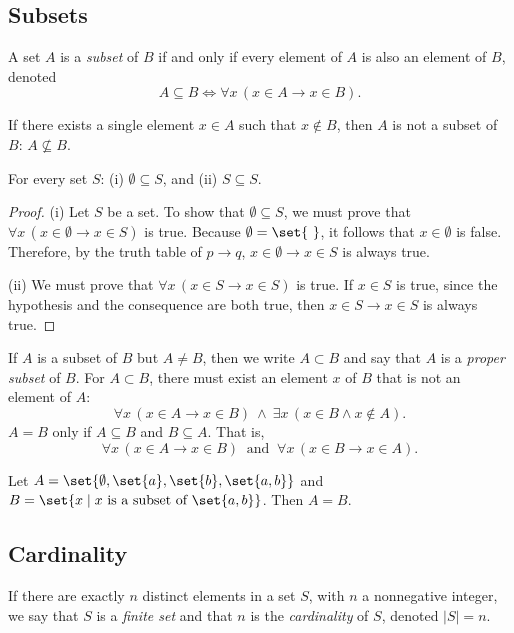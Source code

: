 \subsection{Subsets}
\begin{definition}[Subset]
A set $A$ is a \emph{subset} of $B$ if and only if every element of $A$ is also an element of $B$, denoted
\[
A \subseteq B \iff \forall x\,(x \in A \to x \in B).
\]
\end{definition}
If there exists a single element $x \in A$ such that $x \notin B$, then $A$ is not a subset of $B$: $A \not\subseteq B$.

\begin{theorem}
For every set $S$: (i) $\emptyset \subseteq S$, and (ii) $S \subseteq S$.
\end{theorem}
\begin{proof}
(i) Let $S$ be a set. To show that $\emptyset \subseteq S$, we must prove that $\forall x\,(x \in \emptyset \to x \in S)$ is true. Because $\emptyset = \set{\ }$, it follows that $x \in \emptyset$ is false. Therefore, by the truth table of $p \to q$, $x \in \emptyset \to x \in S$ is always true.

(ii) We must prove that $\forall x\,(x \in S \to x \in S)$ is true. If $x \in S$ is true, since the hypothesis and the consequence are both true, then $x \in S \to x \in S$ is always true.
\end{proof}

If $A$ is a subset of $B$ but $A \neq B$, then we write $A \subset B$ and say that $A$ is a \emph{proper subset} of $B$. For $A \subset B$, there must exist an element $x$ of $B$ that is not an element of $A$:
\[
\forall x\,(x \in A \to x \in B) \ \wedge\ \exists x\,(x \in B \wedge x \notin A).
\]
$A = B$ only if $A \subseteq B$ and $B \subseteq A$. That is,
\[
\forall x\,(x \in A \to x \in B) \ \text{ and } \ \forall x\,(x \in B \to x \in A).
\]

\begin{example}
Let $A = \set{\emptyset, \set{a}, \set{b}, \set{a,b}}$ and $B = \set{x \mid x \text{ is a subset of } \set{a,b}}$. Then $A = B$.
\end{example}

\subsection{Cardinality}
\begin{definition}[Cardinality]
If there are exactly $n$ distinct elements in a set $S$, with $n$ a nonnegative integer, we say that $S$ is a \emph{finite set} and that $n$ is the \emph{cardinality} of $S$, denoted $|S| = n$.
\end{definition}

